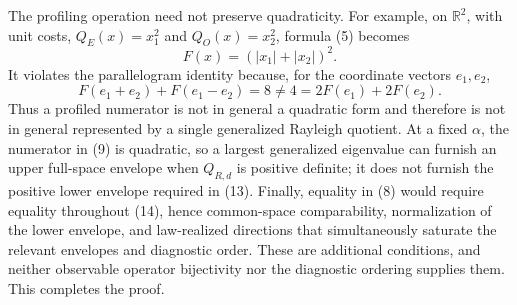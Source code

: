 The profiling operation need not preserve quadraticity.  For example, on \(\mathbb R^2\), with unit costs, \(Q_E(x)=x_1^2\) and \(Q_O(x)=x_2^2\), formula (5) becomes
\[
 F(x)=(|x_1|+|x_2|)^2.
\]
It violates the parallelogram identity because, for the coordinate vectors \(e_1,e_2\),
\[
 F(e_1+e_2)+F(e_1-e_2)=8
 \ne4=2F(e_1)+2F(e_2).
\]
Thus a profiled numerator is not in general a quadratic form and therefore is not in general represented by a single generalized Rayleigh quotient.  At a fixed \(\alpha\), the numerator in (9) is quadratic, so a largest generalized eigenvalue can furnish an upper full-space envelope when \(Q_{R,d}\) is positive definite; it does not furnish the positive lower envelope required in (13).  Finally, equality in (8) would require equality throughout (14), hence common-space comparability, normalization of the lower envelope, and law-realized directions that simultaneously saturate the relevant envelopes and diagnostic order.  These are additional conditions, and neither observable operator bijectivity nor the diagnostic ordering supplies them.  This completes the proof.